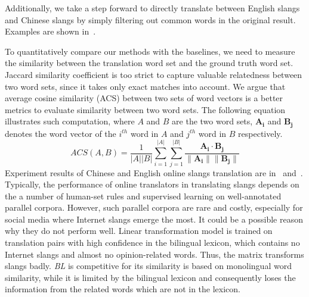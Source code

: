 Additionally, we take a step forward to directly translate between English slangs and Chinese slangs by simply filtering out common words in the original result. Examples are shown in~. 

To quantitatively compare our methods with the baselines, we need to measure the similarity between the translation word set and the ground truth word set. 
Jaccard similarity coefficient is too strict to capture valuable relatedness between two word sets, since it takes only exact matches into account.
We argue that average cosine similarity (ACS) between two sets of word vectors is a better metrics to evaluate similarity between two word sets. The following equation illustrates such computation, where $A$ and $B$ are the two word sets, $\mathbf{A_i}$ and $\mathbf{B_j}$ denotes the word vector of the $i^{th}$ word in $A$ and $j^{th}$ word in $B$ respectively. 
\small
\begin{equation*}
ACS (A,B)=
{\frac{1}{|A||B|}}{\sum_{i=1}^{|A|}{\sum_{j=1}^{|B|}} \frac{\mathbf{A_i }\cdot \mathbf{B_j}}{\|\mathbf{A_i }\|\|\mathbf{B_j }\|}} 
\end{equation*}
Experiment results of Chinese and English online slangs translation are in~ and~.
Typically, the performance of online translators in translating slangs depends on the a number of human-set rules and supervised learning on well-annotated parallel corpora. However, such parallel corpora are rare and costly, especially for social media where Internet slangs emerge the most. It could be a possible reason why they do not perform well. Linear transformation model is trained on translation pairs with high confidence in the bilingual lexicon, which contains no Internet slangs and almost no opinion-related words. Thus, the matrix transforms slangs badly.
\textit{BL} is competitive for its similarity is based on monolingual word similarity, while it is limited by the bilingual lexicon and consequently loses the information from the related words which are not in the lexicon. 

